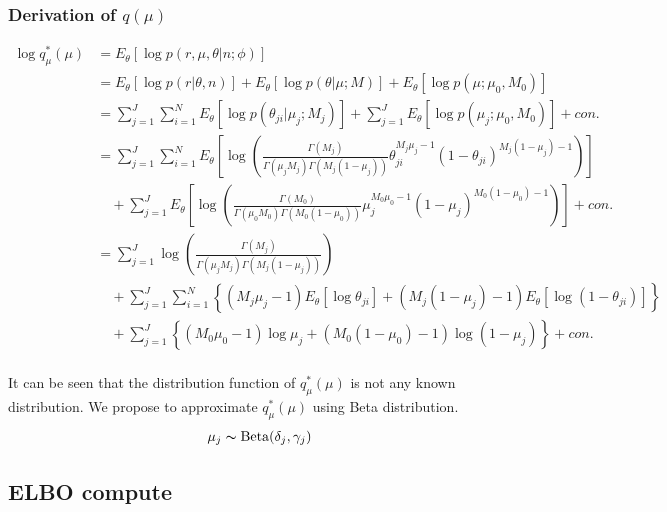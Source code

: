 \documentclass[11pt,reqno]{amsart}
\begin{document}
\subsubsection{Derivation of $ q(\mu) $}
\begin{equation}
\begin{split}
\log q_\mu^*(\mu) &= E_\theta\left[ \log p\left(r,\mu,\theta | n; \phi \right) \right] \\
&= E_\theta \left[ \log p\left(r | \theta, n \right)\right] + E_\theta \left[ \log p\left(\theta | \mu; M \right)\right] + E_\theta \left[ \log p\left(\mu ; \mu_0, M_0 \right)\right] \\
&= \sum_{j=1}^{J} \sum_{i=1}^{N} E_\theta \left[ \log p\left(\theta_{ji} | \mu_j; M_j \right)\right] + \sum_{j=1}^{J} E_\theta  \left[ \log p\left( \mu_j; \mu_0, M_0 \right) \right] + con.\\
&= \sum_{j=1}^{J} \sum_{i=1}^{N}  E_\theta  \left[ \log \left( \frac{ \Gamma(M_j) } { \Gamma(\mu_j M_j) \Gamma(M_j (1-\mu_j)) } \theta_{ji}^{M_j\mu_j -1} (1 - \theta_{ji})^{M_j ( 1 - \mu_j) - 1} \right) \right] \\
&\quad + \sum_{j=1}^{J} E_\theta  \left[ \log \left( \frac{ \Gamma(M_0) } { \Gamma(\mu_0 M_0) \Gamma(M_0 (1-\mu_0)) } \mu_j^{M_0\mu_0 -1} (1 - \mu_j)^{M_0 ( 1 - \mu_0) - 1} \right) \right] + con. \\
&= \sum_{j=1}^{J} \log \left( \frac{ \Gamma(M_j) } { \Gamma(\mu_j M_j) \Gamma(M_j (1-\mu_j)) }\right) \\
&\quad + \sum_{j=1}^{J} \sum_{i=1}^{N} \left\lbrace  \left( M_j\mu_j -1\right) E_\theta  \left[ \log \theta_{ji}\right] + \left( M_j ( 1 - \mu_j) - 1 \right)  E_\theta  \left[ \log \left( 1- \theta_{ji}\right) \right] \right\rbrace \\
&\quad + \sum_{j=1}^{J} \left\lbrace (M_0 \mu_0 - 1) \log \mu_j + (M_0 ( 1 - \mu_0) - 1) \log ( 1 - \mu_j)\right\rbrace  + con. \\
\end{split}
\end{equation}

It can be seen that the distribution function of $ q_\mu^*(\mu) $ is not any known distribution. We propose to approximate $ q_\mu^*(\mu) $ using Beta distribution.
\begin{align}
\mu_j \thicksim \text{Beta}(\delta_j, \gamma_j)
\end{align}



\subsection{ELBO compute}
\end{document}

